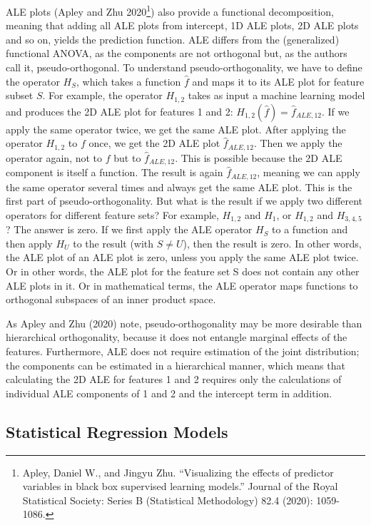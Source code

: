 \documentclass[
  10pt,
]{scrbook}
\begin{document}
ALE plots (Apley and Zhu 2020\footnote{Apley, Daniel W., and Jingyu Zhu. ``Visualizing the effects of predictor variables in black box supervised learning models.'' Journal of the Royal Statistical Society: Series B (Statistical Methodology) 82.4 (2020): 1059-1086.}) also provide a functional decomposition, meaning that adding all ALE plots from intercept, 1D ALE plots, 2D ALE plots and so on, yields the prediction function.
ALE differs from the (generalized) functional ANOVA, as the components are not orthogonal but, as the authors call it, pseudo-orthogonal.
To understand pseudo-orthogonality, we have to define the operator \(H_S\), which takes a function \(\hat{f}\) and maps it to its ALE plot for feature subset \(S\).
For example, the operator \(H_{1,2}\) takes as input a machine learning model and produces the 2D ALE plot for features 1 and 2: \(H_{1,2}(\hat{f}) = \hat{f}_{ALE,12}\).
If we apply the same operator twice, we get the same ALE plot.
After applying the operator \(H_{1,2}\) to \(f\) once, we get the 2D ALE plot \(\hat{f}_{ALE,12}\).
Then we apply the operator again, not to \(f\) but to \(\hat{f}_{ALE,12}\).
This is possible because the 2D ALE component is itself a function.
The result is again \(\hat{f}_{ALE,12}\), meaning we can apply the same operator several times and always get the same ALE plot.
This is the first part of pseudo-orthogonality.
But what is the result if we apply two different operators for different feature sets?
For example, \(H_{1,2}\) and \(H_{1}\), or \(H_{1,2}\) and \(H_{3,4,5}\)?
The answer is zero.
If we first apply the ALE operator \(H_S\) to a function and then apply \(H_U\) to the result (with \(S \neq U\)), then the result is zero.
In other words, the ALE plot of an ALE plot is zero, unless you apply the same ALE plot twice.
Or in other words, the ALE plot for the feature set S does not contain any other ALE plots in it.
Or in mathematical terms, the ALE operator maps functions to orthogonal subspaces of an inner product space.

As Apley and Zhu (2020) note, pseudo-orthogonality may be more desirable than hierarchical orthogonality, because it does not entangle marginal effects of the features.
Furthermore, ALE does not require estimation of the joint distribution; the components can be estimated in a hierarchical manner, which means that calculating the 2D ALE for features 1 and 2 requires only the calculations of individual ALE components of 1 and 2 and the intercept term in addition.

\hypertarget{statistical-regression-models}{%
\subsection{Statistical Regression Models}\label{statistical-regression-models}}
\end{document}
